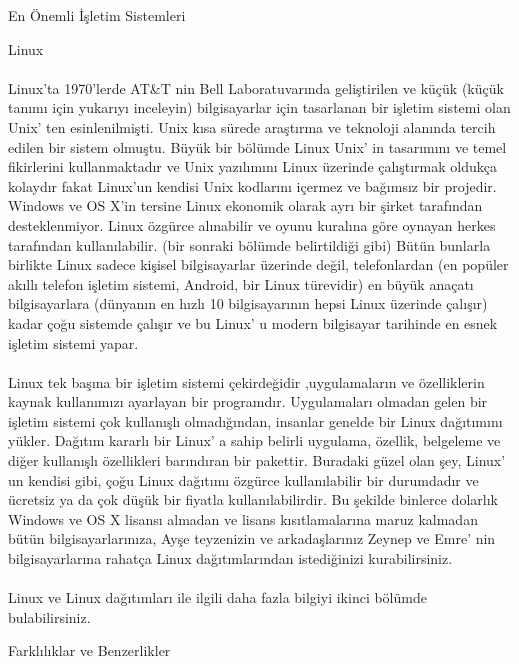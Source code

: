 \documentclass[10pt,a5paper]{book}
\begin{document}
\begin{section}{En Önemli İşletim Sistemleri}
\begin{subsection}{Linux}
\paragraph{}{Linux'ta 1970'lerde AT\&T nin Bell Laboratuvarında geliştirilen ve küçük (küçük tanımı için yukarıyı inceleyin) bilgisayarlar için tasarlanan bir işletim sistemi olan Unix' ten esinlenilmişti. Unix kısa sürede araştırma ve teknoloji alanında tercih edilen bir sistem olmuştu. Büyük bir bölümde Linux Unix' in tasarımını ve temel fikirlerini kullanmaktadır ve Unix yazılımını Linux üzerinde çalıştırmak oldukça kolaydır fakat Linux'un kendisi Unix kodlarını içermez ve bağımsız bir projedir. Windows ve OS X'in tersine Linux ekonomik olarak ayrı bir şirket tarafından desteklenmiyor. Linux özgürce alınabilir ve oyunu kuralına göre oynayan herkes tarafından kullanılabilir. (bir sonraki bölümde belirtildiği gibi) Bütün bunlarla birlikte Linux sadece kişisel bilgisayarlar üzerinde değil, telefonlardan (en popüler akıllı telefon işletim sistemi, Android, bir Linux türevidir) en büyük anaçatı bilgisayarlara (dünyanın en hızlı 10 bilgisayarının hepsi Linux üzerinde çalışır) kadar çoğu sistemde çalışır ve bu Linux' u modern bilgisayar tarihinde en esnek işletim sistemi yapar.}
\paragraph{}{Linux tek başına bir işletim sistemi çekirdeğidir ,uygulamaların ve özelliklerin kaynak kullanımızı ayarlayan bir programdır. Uygulamaları olmadan gelen bir işletim sistemi çok kullanışlı olmadığından, insanlar genelde bir Linux dağıtımını yükler. Dağıtım kararlı bir Linux' a sahip belirli uygulama, özellik, belgeleme ve diğer kullanışlı özellikleri barındıran bir pakettir. Buradaki güzel olan şey, Linux' un kendisi gibi, çoğu Linux dağıtımı özgürce kullanılabilir bir durumdadır ve ücretsiz ya da çok düşük bir fiyatla kullanılabilirdir. Bu şekilde binlerce dolarlık Windows ve OS X lisansı almadan ve lisans kısıtlamalarına maruz kalmadan bütün bilgisayarlarınıza, Ayşe teyzenizin ve arkadaşlarınız Zeynep ve Emre' nin bilgisayarlarına rahatça Linux dağıtımlarından istediğinizi kurabilirsiniz.}
\paragraph{}{Linux ve Linux dağıtımları ile ilgili daha fazla bilgiyi ikinci bölümde bulabilirsiniz.}
\end{subsection}
\begin{subsection}{Farklılıklar ve Benzerlikler}

\end{subsection}
\end{section}
\end{document}
